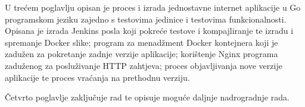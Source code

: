 U trećem poglavlju opisan je proces i izrada jednostavne internet aplikacije u Go programskom jeziku
zajedno s testovima jedinice i testovima funkcionalnosti. Opisana je izrada Jenkins posla koji
pokreće testove i kompajliranje te izradu i spremanje Docker slike; program za
menadžment Docker kontejnera koji je zadužen za pokretanje zadnje verzije aplikacije; korištenje
Nginx programa zaduženog za posluživanje HTTP zahtjeva; proces objavljivanja nove verzije aplikacije
te proces vraćanja na prethodnu verziju.

Četvrto poglavlje zaključuje rad te opisuje moguće daljnje nadrogradnje rada.
